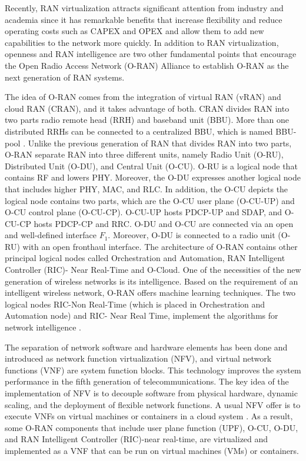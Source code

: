 \documentclass[conference]{IEEEtran}
\begin{document}
Recently, RAN virtualization attracts significant attention from industry and academia since it has remarkable benefits that increase flexibility and reduce operating costs such as CAPEX and OPEX and allow them to add new capabilities to the network more quickly. In addition to RAN virtualization, openness and RAN intelligence are two other fundamental points that encourage the Open Radio Access Network (O-RAN) Alliance to establish O-RAN as the next generation of RAN systems. 

The idea of O-RAN comes from the integration of virtual RAN (vRAN) and cloud RAN (CRAN), and it takes advantage of both. CRAN divides RAN into two parts radio remote head (RRH) and baseband unit (BBU).  More than one distributed RRHs can be connected to a centralized BBU, which is named BBU-pool \cite{han2019research}. 
Unlike the previous generation of RAN that divides RAN into two parts, O-RAN separate RAN into three different units, namely Radio Unit (O-RU), Distributed Unit (O-DU), and Central Unit (O-CU). 
O-RU is a logical node that contains RF and lowers PHY. Moreover, the O-DU expresses another logical node that includes higher PHY, MAC, and RLC.
 In addition, the O-CU depicts the logical node contains two parts, which are the O-CU user plane (O-CU-UP) and O-CU control plane (O-CU-CP). O-CU-UP hosts PDCP-UP and SDAP, and O-CU-CP hosts PDCP-CP and RRC.
O-DU and O-CU are connected via an open and well-defined interface $F_1$.
Moreover, O-DU is connected to a radio unit (O-RU) with an open fronthaul interface.
The architecture of O-RAN contains other principal logical nodes called Orchestration and Automation,
RAN Intelligent Controller (RIC)- Near Real-Time and O-Cloud. 
One of the necessities of the new generation of wireless networks is its intelligence.
Based on the requirement of an intelligent wireless network, O-RAN offers machine learning techniques. The two logical nodes RIC-Non Real-Time (which is placed in Orchestration and Automation node) and RIC- Near Real Time, implement the algorithms for network intelligence 
\cite{gavrilovska2020cloud,niknam2020intelligent,kazemifard2021minimum,both2021system,ORANArch,ORANML,lin2021toward}.

The separation of network software and hardware elements has been done and introduced as network function virtualization (NFV), and virtual network functions (VNF) are system function blocks. This technology improves the system performance in the fifth generation of telecommunications. 
The key idea of the implementation of NFV is to decouple software from physical hardware, dynamic scaling, and the deployment of flexible network functions. A usual NFV offer is to execute VNFs on virtual machines or containers in a cloud system \cite{mijumbi2015network, luo2020online}.
As a result, some O-RAN components that include user plane function (UPF), O-CU, O-DU, and RAN Intelligent Controller (RIC)-near real-time, are virtualized and implemented as a VNF that can be run on virtual machines (VMs) or containers.
\end{document}
